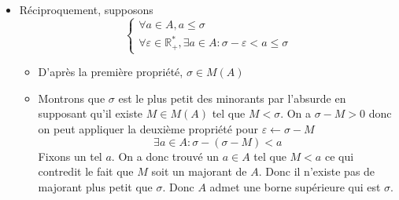 \documentclass{article}
\begin{document}
\begin{question_kholle}
\begin{itemize}[label = $\star$]
    \item Réciproquement, supposons
          $$
            \left\{ \begin{array}{ll}
              \forall a \in A, a \leqslant \sigma \\
              \forall \varepsilon \in \mathbb{R}_{+}^{*}, \exists a \in A : \sigma - \varepsilon < a \leqslant \sigma
            \end{array}\right.
          $$
          \begin{itemize}[label = $\bullet$]
            \item D'après la première propriété, $\sigma \in M(A)$
            \item Montrons que $\sigma$ est le plus petit des minorants par l'absurde en supposant qu'il existe $M \in M(A)$ tel que $M < \sigma$.
                  On a $\sigma - M >0$ donc on peut appliquer la deuxième propriété pour $\varepsilon \leftarrow \sigma - M$
                  $$
                    \exists a \in A : \sigma - (\sigma - M )<a
                  $$
                  Fixons un tel $a$.
                  On a donc trouvé un $a \in A$ tel que $M < a$ ce qui contredit le fait que $M$ soit un majorant de $A$.
                  Donc il n'existe pas de majorant plus petit que $\sigma$.
                  Donc $A$ admet une borne supérieure qui est $\sigma$.
          \end{itemize}
  \end{itemize}
\end{question_kholle}
\end{document}
